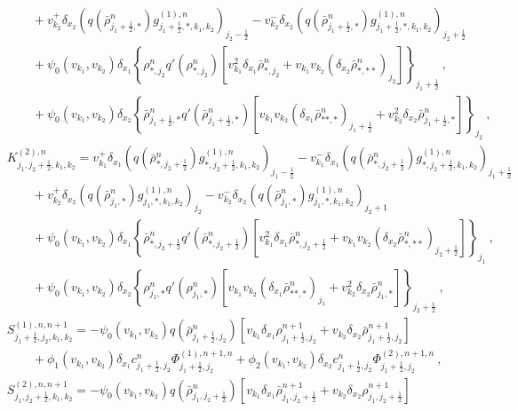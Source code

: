 \documentclass{article}
\begin{document}
{\begin{align*}
    & \qquad + v_{k_2}^+\delta_{x_2}(q( {\bar{\rho}}_{j_1+\frac12,*}^n) g_{j_1+\frac12, *,k_1,k_2}^{(1),n})_{j_2-\frac12} - v_{k_2}^-\delta_{x_2}(q( {\bar{\rho}}_{j_1+\frac12,*}^n) g_{j_1+\frac12,*,k_1,k_2}^{(1),n})_{j_2+\frac12} \\
    &\qquad + \psi_{0}(v_{k_1}, v_{k_2})\delta_{x_1}\left\{ {\rho}_{*,j_2}^n q'( {\rho}_{*,j_2}^n)\left[v_{k_1}^2\delta_{x_1}\bar{\rho}_{*,j_2}^n + v_{k_1}v_{k_2}(\delta_{x_2}\bar{\rho}_{*,**}^n)_{j_2} \right]\right\}_{j_1+\frac12}\ , \\
    &\qquad + \psi_{0}(v_{k_1}, v_{k_2})\delta_{x_2}\left\{ {\bar{\rho}}_{j_1+\frac12,*}^n q'( {\bar{\rho}}_{j_1+\frac12,*}^n)\left[v_{k_1}v_{k_2}(\delta_{x_1}\bar{\rho}_{**,*}^n)_{j_1+\frac12} + v_{k_2}^2 \delta_{x_2}\bar{\rho}_{j_1+\frac12,*}^n\right]\right\}_{j_2}\ , \\
    & K_{j_1,j_2+\frac12,k_1, k_2}^{(2),n}  = v_{k_1}^+\delta_{x_1}(q( {\bar{\rho}}_{*,j_2+\frac12}^n) g_{*,j_2+\frac12,k_1,k_2}^{(1),n})_{j_1-\frac12} - v_{k_1}^-\delta_{x_1}(q( {\bar{\rho}}_{*,j_2+\frac12}^n) g_{*,j_2+\frac12,k_1,k_2}^{(1),n})_{j_1+\frac12}\\
    & \qquad + v_{k_2}^+\delta_{x_2}(q( {\bar{\rho}}_{j_1,*}^n) g_{j_1, *,k_1,k_2}^{(1),n})_{j_2} - v_{k_2}^-\delta_{x_2}(q( {\bar{\rho}}_{j_1,*}^n) g_{j_1,*,k_1,k_2}^{(1),n})_{j_2+1} \\
    &\qquad + \psi_{0}(v_{k_1}, v_{k_2})\delta_{x_1}\left\{ {\bar{\rho}}_{*,j_2+\frac12}^n q'( {\bar{\rho}}_{*,j_2+\frac12}^n)\left[v_{k_1}^2\delta_{x_1}\bar{\rho}_{*,j_2+\frac12}^n + v_{k_1}v_{k_2}(\delta_{x_2}\bar{\rho}_{*,**}^n)_{j_2+\frac12} \right]\right\}_{j_1}\ , \\
    &\qquad + \psi_{0}(v_{k_1}, v_{k_2})\delta_{x_2}\left\{ {\rho}_{j_1,*}^n q'( {\rho}_{j_1,*}^n)\left[v_{k_1}v_{k_2}(\delta_{x_1}\bar{\rho}_{**,*}^n)_{j_1} + v_{k_2}^2 \delta_{x_2}\bar{\rho}_{j_1,*}^n \right]\right\}_{j_2+\frac12}\ , \\
    & S_{j_1+\frac12, j_2, k_1, k_2}^{(1), n, n+1} = -\psi_{0}(v_{k_1}, v_{k_2})q( \bar{{\rho}}_{j_1+\frac12,j_2}^n)  \left[v_{k_1} \delta_{x_1} \rho_{j_1+\frac12, j_2}^{n+1} + v_{k_2} \delta_{x_2} \bar{\rho}_{j_1+\frac12, j_2}^{n+1} \right] \\
    & \qquad  + \phi_{1}(v_{k_1}, v_{k_2})\delta_{x_1} c_{j_1+\frac12,j_2}^n \Phi^{(1),n+1,n}_{j_1+\frac12,j_2}+\phi_{2}(v_{k_1}, v_{k_2}) \delta_{x_2} c_{j_1+\frac12,j_2}^n
    \Phi^{(2),n+1,n}_{j_1+\frac12,j_2}
    \ ,\\
    & S_{j_1, j_2+\frac12, k_1, k_2}^{(2), n, n+1} = -\psi_{0}(v_{k_1}, v_{k_2})q( \bar{{\rho}}_{j_1,j_2+\frac12}^n)  \left[v_{k_1} \delta_{x_1} \bar{\rho}_{j_1, j_2+\frac12}^{n+1} + v_{k_2} \delta_{x_2} \rho_{j_1, j_2+\frac12}^{n+1} \right] \\

\end{align*}}
\end{document}
